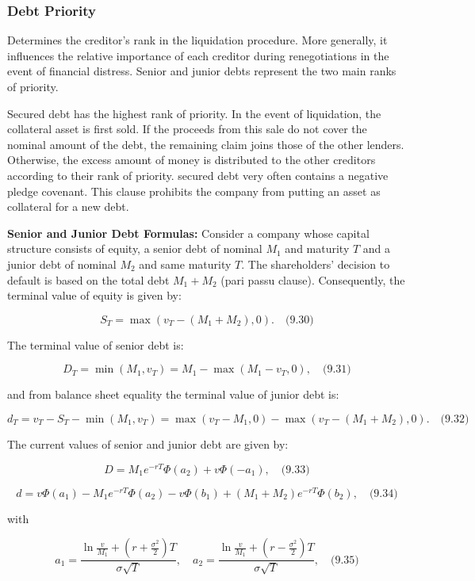 \documentclass[12pt,a4paper]{article}
\begin{document}
\subsubsection{Debt Priority }
Determines the creditor's rank in the liquidation procedure. More generally, it influences the relative importance of each creditor during renegotiations in the event of financial distress. Senior and junior debts represent the two main ranks of priority.

Secured debt has the highest rank of priority. In the event of liquidation, the collateral asset is first 
sold. If the proceeds from this sale do not cover the nominal amount of the debt, the remaining 
claim joins those of the other lenders. Otherwise, the excess amount of money is distributed to 
the other creditors according to their rank of priority. secured debt very often contains a negative pledge covenant. This 
clause prohibits the company from putting an asset as collateral for a new debt.

\textbf{Senior and Junior Debt Formulas:} Consider a company whose capital structure consists of equity, a senior debt of nominal $M_1$ and maturity $T$ and a junior debt of nominal $M_2$ and same maturity $T$. The shareholders' decision to default is based on the total debt $M_1 + M_2$ (pari passu clause). Consequently, the terminal value of equity is given by:

$$S_T = \max(v_T - (M_1 + M_2), 0). \quad \text{(9.30)}$$

The terminal value of senior debt is:

$$D_T = \min(M_1, v_T) = M_1 - \max(M_1 - v_T, 0), \quad \text{(9.31)}$$

and from balance sheet equality the terminal value of junior debt is:

$$d_T = v_T - S_T - \min(M_1, v_T) = \max(v_T - M_1, 0) - \max(v_T - (M_1 + M_2), 0). \quad \text{(9.32)}$$

The current values of senior and junior debt are given by:

$$D = M_1 e^{-rT}\Phi(a_2) + v\Phi(-a_1), \quad \text{(9.33)}$$

$$d = v\Phi(a_1) - M_1 e^{-rT}\Phi(a_2) - v\Phi(b_1) + (M_1 + M_2)e^{-rT}\Phi(b_2), \quad \text{(9.34)}$$

with

$$a_1 = \frac{\ln \frac{v}{M_1} + (r + \frac{\sigma^2}{2})T}{\sigma\sqrt{T}}, \quad a_2 = \frac{\ln \frac{v}{M_1} + (r - \frac{\sigma^2}{2})T}{\sigma\sqrt{T}}, \quad \text{(9.35)}$$
\end{document}
